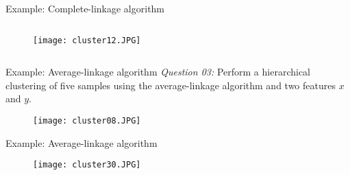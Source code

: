 \begin{frame}{Example: Complete-linkage algorithm}
\begin{columns}
\begin{column}{5cm}
\begin{figure}
\texttt{[image: cluster12.JPG]}
\end{figure}
\begin{itemize}
\vspace{-20pt}
\end{itemize}
\end{column}
\begin{column}{5.5cm}
\end{column}
\end{columns}
\end{frame}

\begin{frame}{Example: Average-linkage algorithm}
\textit{\color{mycolor2}Question 03:} Perform a hierarchical clustering of five samples using the average-linkage algorithm and two features $x$ and $y$.
\begin{figure}
\texttt{[image: cluster08.JPG]}
\end{figure}
\end{frame}

\begin{frame}{Example: Average-linkage algorithm}
\begin{figure}
\texttt{[image: cluster30.JPG]}
\end{figure}
\end{frame}

